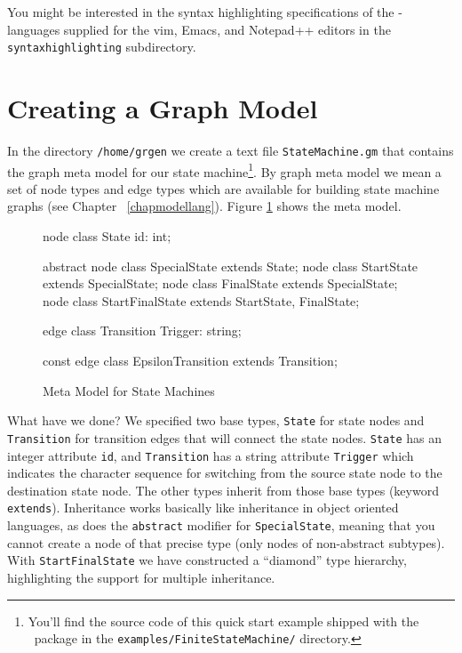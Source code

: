 \begin{note}
You might be interested in the syntax highlighting specifications of the \GrG-languages supplied for the vim, Emacs, and Notepad++ editors in the \texttt{syntaxhighlighting} subdirectory.
\end{note}


\section{Creating a Graph Model}

In the directory \texttt{/home/grgen} we create a text file \texttt{StateMachine.gm} that contains the graph meta model for our state machine\footnote{You'll find the source code of this quick start example shipped with the \GrG\ package in the \texttt{examples/FiniteStateMachine/} directory.}.
By graph meta model we mean a set of node types and edge types which are available for building state machine graphs (see Chapter~
\ref{chapmodellang}).
Figure \ref{fig:quick:mm} shows the meta model.

\begin{figure}[htbp]
    \centering
    \begin{grgen}
node class State {
    id: int;
}

abstract node class SpecialState extends State;
node class StartState extends SpecialState;
node class FinalState extends SpecialState;
node class StartFinalState extends StartState, FinalState;

edge class Transition {
    Trigger: string;
}

const edge class EpsilonTransition extends Transition;
    \end{grgen}
    \caption{Meta Model for State Machines}
    \label{fig:quick:mm}
\end{figure}

What have we done?
We specified two base types, \texttt{State} for state nodes and \texttt{Transition} for transition edges that will connect the state nodes.
\texttt{State} has an integer attribute \texttt{id}, and \texttt{Transition} has a string attribute \texttt{Trigger} which indicates the character sequence for switching from the source state node to the destination state node.
The other types inherit from those base types (keyword \texttt{extends}). 
Inheritance works basically like inheritance in object oriented languages,
as does the \texttt{abstract} modifier for \texttt{SpecialState}, meaning that you cannot create a node of that precise type (only nodes of non-abstract subtypes).
With \texttt{StartFinalState} we have constructed a ``diamond'' type hierarchy,
highlighting the support for multiple inheritance.


